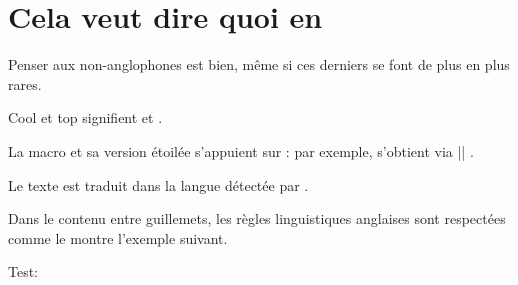 \documentclass{tutodoc}
\begin{document}
\section{Cela veut dire quoi en }

Penser aux non-anglophones est bien, même si ces derniers se font de plus en plus rares.

\begin{tdoclatex}
Cool et top signifient  et .
\end{tdoclatex}


La macro  et sa version étoilée s'appuient sur  : par exemple,  s'obtient via \tdocinlatex|| .


\begin{tdocnote}
    Le texte  est traduit dans la langue détectée par \thisproj.
\end{tdocnote}


Dans le contenu entre guillemets, les règles linguistiques anglaises sont respectées comme le montre l'exemple suivant.

\begin{tdoclatex}
Test: 

\end{tdoclatex}
\end{document}
